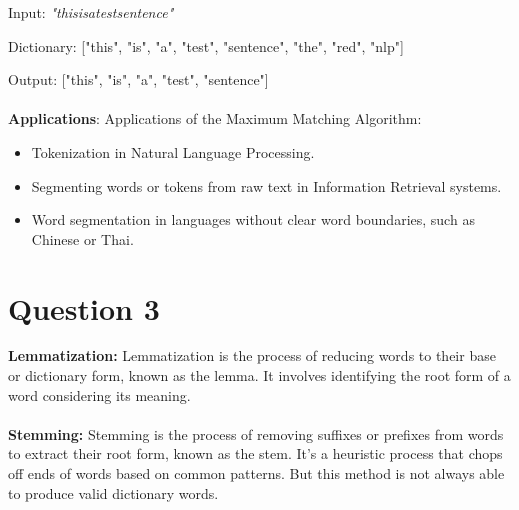 \documentclass{article}
\begin{document}
Input: \textit{"thisisatestsentence"}

Dictionary: ["this", "is", "a", "test", "sentence", "the", "red", "nlp"]

Output: ["this", "is", "a", "test", "sentence"]\\\\

\textbf{Applications}: Applications of the Maximum Matching Algorithm:
\begin{itemize}
  \item Tokenization in Natural Language Processing.
  \item Segmenting words or tokens from raw text in Information Retrieval systems.
  \item Word segmentation in languages without clear word boundaries, such as Chinese or Thai.
\end{itemize}

\pagebreak

\section{Question 3}
\textbf{Lemmatization:} Lemmatization is the process of reducing words to their base or dictionary form, known as the lemma. It involves identifying the root form of a word considering its meaning. \\\\
\textbf{Stemming:} Stemming is the process of removing suffixes or prefixes from words to extract their root form, known as the stem. It's a heuristic process that chops off ends of words based on common patterns. But this method is not always able to produce valid dictionary words.
\end{document}
